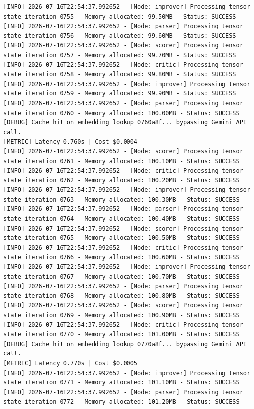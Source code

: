 \documentclass[10pt,journal,compsoc]{IEEEtran}
\begin{document}
\begin{verbatim}
[INFO] 2026-07-16T22:54:37.992652 - [Node: improver] Processing tensor state iteration 0755 - Memory allocated: 99.50MB - Status: SUCCESS
[INFO] 2026-07-16T22:54:37.992652 - [Node: parser] Processing tensor state iteration 0756 - Memory allocated: 99.60MB - Status: SUCCESS
[INFO] 2026-07-16T22:54:37.992652 - [Node: scorer] Processing tensor state iteration 0757 - Memory allocated: 99.70MB - Status: SUCCESS
[INFO] 2026-07-16T22:54:37.992652 - [Node: critic] Processing tensor state iteration 0758 - Memory allocated: 99.80MB - Status: SUCCESS
[INFO] 2026-07-16T22:54:37.992652 - [Node: improver] Processing tensor state iteration 0759 - Memory allocated: 99.90MB - Status: SUCCESS
[INFO] 2026-07-16T22:54:37.992652 - [Node: parser] Processing tensor state iteration 0760 - Memory allocated: 100.00MB - Status: SUCCESS
[DEBUG] Cache hit on embedding lookup 0760a8f... bypassing Gemini API call.
[METRIC] Latency 0.760s | Cost $0.0004
[INFO] 2026-07-16T22:54:37.992652 - [Node: scorer] Processing tensor state iteration 0761 - Memory allocated: 100.10MB - Status: SUCCESS
[INFO] 2026-07-16T22:54:37.992652 - [Node: critic] Processing tensor state iteration 0762 - Memory allocated: 100.20MB - Status: SUCCESS
[INFO] 2026-07-16T22:54:37.992652 - [Node: improver] Processing tensor state iteration 0763 - Memory allocated: 100.30MB - Status: SUCCESS
[INFO] 2026-07-16T22:54:37.992652 - [Node: parser] Processing tensor state iteration 0764 - Memory allocated: 100.40MB - Status: SUCCESS
[INFO] 2026-07-16T22:54:37.992652 - [Node: scorer] Processing tensor state iteration 0765 - Memory allocated: 100.50MB - Status: SUCCESS
[INFO] 2026-07-16T22:54:37.992652 - [Node: critic] Processing tensor state iteration 0766 - Memory allocated: 100.60MB - Status: SUCCESS
[INFO] 2026-07-16T22:54:37.992652 - [Node: improver] Processing tensor state iteration 0767 - Memory allocated: 100.70MB - Status: SUCCESS
[INFO] 2026-07-16T22:54:37.992652 - [Node: parser] Processing tensor state iteration 0768 - Memory allocated: 100.80MB - Status: SUCCESS
[INFO] 2026-07-16T22:54:37.992652 - [Node: scorer] Processing tensor state iteration 0769 - Memory allocated: 100.90MB - Status: SUCCESS
[INFO] 2026-07-16T22:54:37.992652 - [Node: critic] Processing tensor state iteration 0770 - Memory allocated: 101.00MB - Status: SUCCESS
[DEBUG] Cache hit on embedding lookup 0770a8f... bypassing Gemini API call.
[METRIC] Latency 0.770s | Cost $0.0005
[INFO] 2026-07-16T22:54:37.992652 - [Node: improver] Processing tensor state iteration 0771 - Memory allocated: 101.10MB - Status: SUCCESS
[INFO] 2026-07-16T22:54:37.992652 - [Node: parser] Processing tensor state iteration 0772 - Memory allocated: 101.20MB - Status: SUCCESS

\end{verbatim}
\end{document}
